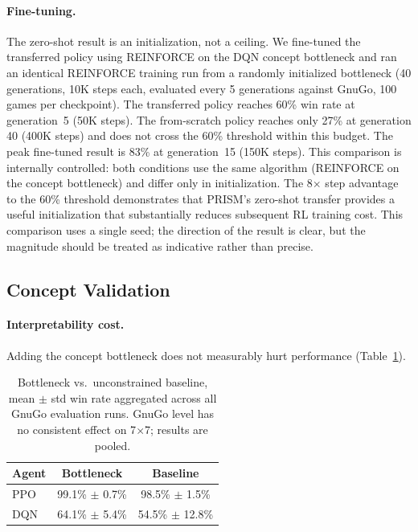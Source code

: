 \documentclass[11pt,a4paper]{article}
\begin{document}
\paragraph{Fine-tuning.}
The zero-shot result is an initialization, not a ceiling. We fine-tuned the transferred policy using REINFORCE on the DQN concept bottleneck and ran an identical REINFORCE training run from a randomly initialized bottleneck (40 generations, 10K steps each, evaluated every 5 generations against GnuGo, 100 games per checkpoint). The transferred policy reaches 60\% win rate at generation~5 (50K steps). The from-scratch policy reaches only 27\% at generation 40 (400K steps) and does not cross the 60\% threshold within this budget. The peak fine-tuned result is 83\% at generation~15 (150K steps). This comparison is internally controlled: both conditions use the same algorithm (REINFORCE on the concept bottleneck) and differ only in initialization. The 8$\times$ step advantage to the 60\% threshold demonstrates that PRISM's zero-shot transfer provides a useful initialization that substantially reduces subsequent RL training cost. This comparison uses a single seed; the direction of the result is clear, but the magnitude should be treated as indicative rather than precise.

\subsection{Concept Validation}
\label{sec:validation}

\paragraph{Interpretability cost.}
Adding the concept bottleneck does not measurably hurt performance (Table~\ref{tab:perf}).

\begin{table}[t]
\centering
\caption{Bottleneck vs.\ unconstrained baseline, mean $\pm$ std win rate aggregated across all GnuGo evaluation runs. GnuGo level has no consistent effect on 7$\times$7; results are pooled.}
\label{tab:perf}
\begin{tabular}{lcc}
\toprule
\textbf{Agent} & \textbf{Bottleneck} & \textbf{Baseline} \\
\midrule
PPO & 99.1\% $\pm$ 0.7\% & 98.5\% $\pm$ 1.5\% \\
DQN & 64.1\% $\pm$ 5.4\% & 54.5\% $\pm$ 12.8\% \\
\bottomrule
\end{tabular}
\end{table}
\end{document}
